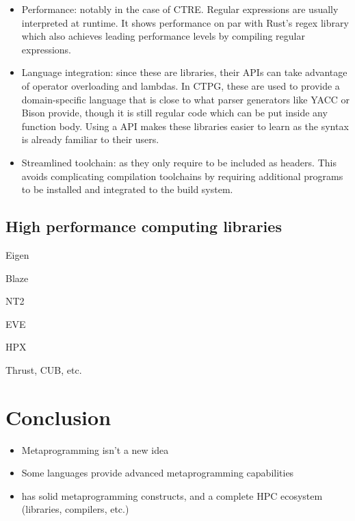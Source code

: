 \documentclass[../../main.tex]{subfiles}
\begin{document}
\begin{itemize}

\item Performance: notably in the case of CTRE.
Regular expressions are usually interpreted at runtime.
It shows performance on par with Rust's regex library
which also achieves leading performance levels
by compiling regular expressions.

\item Language integration: since these are \cpp libraries,
their APIs can take advantage of \cpp operator overloading and lambdas.
In CTPG, these are used to provide a domain-specific language that is close to
what parser generators like YACC or Bison provide,
though it is still regular \cpp code which can be put inside any function body.
Using a \cpp API makes these libraries easier to learn
as the syntax is already familiar to their users.

\item Streamlined toolchain: as they only require to be included as headers.
This avoids complicating compilation toolchains by requiring additional programs
to be installed and integrated to the build system.

\end{itemize}

\subsection{High performance computing libraries}

Eigen

Blaze

NT2

EVE

HPX

Thrust, CUB, etc.

\section{Conclusion}

\begin{itemize}
\item Metaprogramming isn't a new idea

\item Some languages provide advanced metaprogramming capabilities

\item \cpp has solid metaprogramming constructs, and a complete HPC ecosystem
(libraries, compilers, etc.)
\end{itemize}
\end{document}
